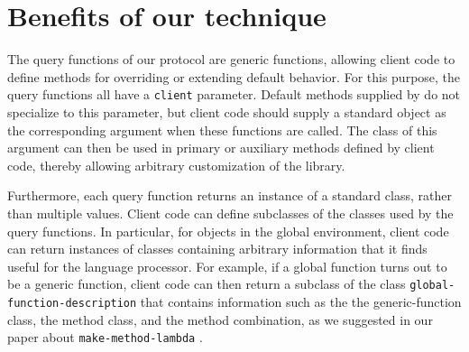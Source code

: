 \section{Benefits of our technique}
 
The query functions of our protocol are generic functions, allowing
client code to define methods for overriding or extending default
behavior.  For this purpose, the query functions all have a
\texttt{client} parameter.  Default methods supplied by \trucler{} do
not specialize to this parameter, but client code should supply a
standard object as the corresponding argument when these functions are
called.  The class of this argument can then be used in primary or
auxiliary methods defined by client code, thereby allowing arbitrary
customization of the library.

Furthermore, each query function returns an instance of a standard
class, rather than multiple values.  Client code can define subclasses
of the classes used by the query functions.  In particular, for
objects in the global environment, client code can return instances of
classes containing arbitrary information that it finds useful for the
language processor.  For example, if a global function turns out to be
a generic function, client code can then return a subclass of the
\trucler{} class \texttt{global-function-description} that contains
information such as the the generic-function class, the method class,
and the method combination, as we suggested in our paper about
\texttt{make-method-lambda} \cite{DBLP:conf/els/DurandS19}.
